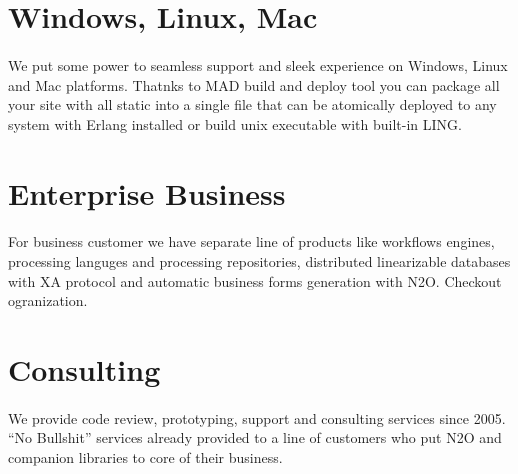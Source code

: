 \documentclass[11pt]{article}
\begin{document}
\paragraph{}

\section*{Windows, Linux, Mac}
\paragraph{}
We put some power to seamless support and sleek experience on Windows, Linux and Mac platforms.
Thatnks to MAD build and deploy tool you can package all your site with all static into a single file
that can be atomically deployed to any system with Erlang installed or build unix
executable with built-in LING.

\section*{Enterprise Business}
\paragraph{}
For business customer we have separate line of products like workflows engines,
processing languges and processing repositories, distributed linearizable
databases with XA protocol and automatic business forms generation with N2O.
Checkout  ogranization.

\section*{Consulting}
\paragraph{}
We provide code review, prototyping, support and consulting services since 2005.
``No Bullshit'' services already provided to a line of customers who put N2O
and companion libraries to core of their business.
\end{document}

